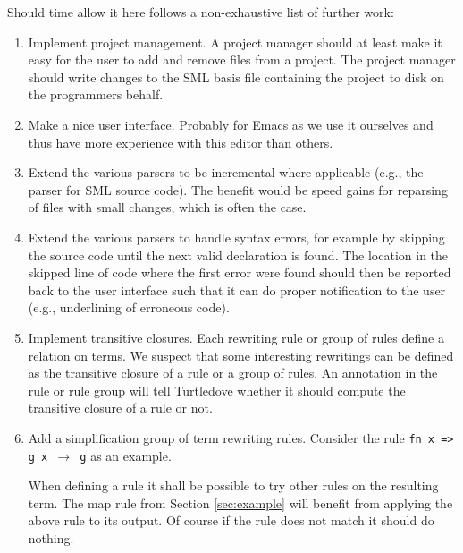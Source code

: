 \documentclass[a4paper,oneside]{article}
\begin{document}
Should time allow it here follows a non-exhaustive list of further work:

\begin{enumerate}

\item Implement project management. A project manager should at least make it easy for the user to
  add and remove files from a project. The project manager should write changes to the SML basis
  file containing the project to disk on the programmers behalf.

\item Make a nice user interface. Probably for Emacs as we use it ourselves and thus have more
  experience with this editor than others.

\item Extend the various parsers to be incremental where applicable (e.g., the parser for SML source
  code). The benefit would be speed gains for reparsing of files with small changes, which is often
  the case.

\item Extend the various parsers to handle syntax errors, for example by skipping the source code
  until the next valid declaration is found. The location in the skipped line of code where the
  first error were found should then be reported back to the user interface such that it can do
  proper notification to the user (e.g., underlining of erroneous code).


\item Implement transitive closures. Each rewriting rule or group of rules define a relation on
  terms. We suspect that some interesting rewritings can be defined as the transitive closure of a
  rule or a group of rules. An annotation in the rule or rule group will tell Turtledove whether it
  should compute the transitive closure of a rule or not.

\item Add a simplification group of term rewriting rules. Consider the rule \texttt{fn x => g x
    $\rightarrow$ g} as an example.

  When defining a rule it shall be possible to try other rules on the resulting term. The map rule
  from Section \ref{sec:example} will benefit from applying the above rule to its output. Of course
  if the rule does not match it should do nothing.


\end{enumerate}
\end{document}
